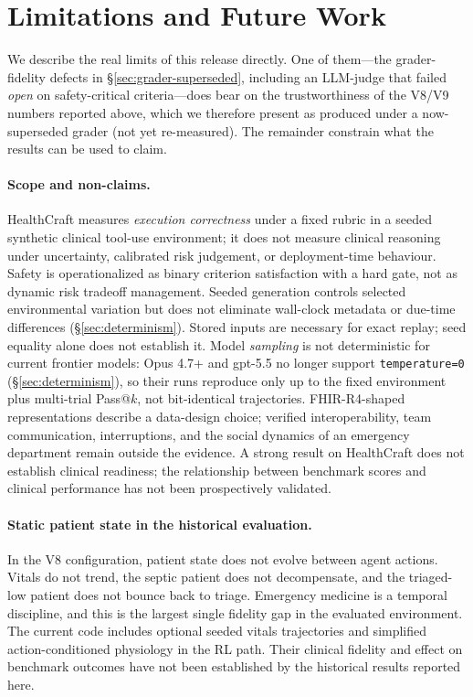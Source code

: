\section{Limitations and Future Work}
\label{sec:limits}

We describe the real limits of this release directly. One of them---the
grader-fidelity defects in \S\ref{sec:grader-superseded}, including an
LLM-judge that failed \emph{open} on safety-critical criteria---does bear
on the trustworthiness of the V8/V9 numbers reported above, which we
therefore present as produced under a now-superseded grader (not yet
re-measured). The remainder constrain what the results can be used to
claim.

\paragraph{Scope and non-claims.}
HealthCraft measures \emph{execution correctness} under a fixed
rubric in a seeded synthetic clinical tool-use environment; it does not
measure clinical reasoning under uncertainty, calibrated risk
judgement, or deployment-time behaviour. Safety is operationalized as
binary criterion satisfaction with a hard gate, not as dynamic risk
tradeoff management. Seeded generation controls selected environmental
variation but does not eliminate wall-clock metadata or due-time differences
(\S\ref{sec:determinism}). Stored inputs are necessary for exact replay;
seed equality alone does not establish it. Model
\emph{sampling} is not deterministic for current frontier models: Opus 4.7+
and gpt-5.5 no longer support \texttt{temperature=0}
(\S\ref{sec:determinism}), so their runs reproduce only up to the fixed
environment plus multi-trial Pass@$k$, not bit-identical trajectories.
FHIR-R4-shaped representations describe a data-design choice; verified
interoperability, team communication, interruptions, and the social
dynamics of an emergency department remain outside the evidence. A
strong result on HealthCraft does not establish clinical readiness;
the relationship between benchmark scores and clinical performance
has not been prospectively validated.

\paragraph{Static patient state in the historical evaluation.}
In the V8 configuration, patient state does not evolve between agent actions. Vitals do not
trend, the septic patient does not decompensate, and the triaged-low
patient does not bounce back to triage. Emergency medicine is a
temporal discipline, and this is the largest single fidelity gap in
the evaluated environment. The current code includes optional seeded
vitals trajectories and simplified action-conditioned physiology in the
RL path. Their clinical fidelity and effect on benchmark outcomes have
not been established by the historical results reported here.

